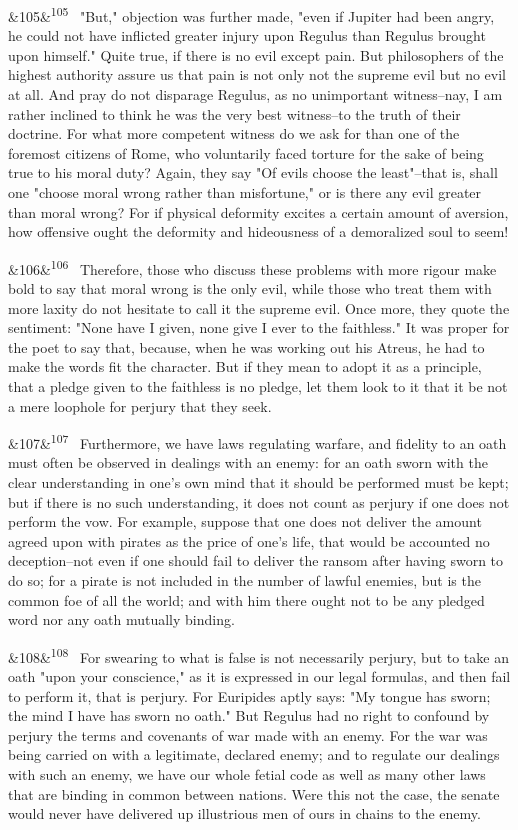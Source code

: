 \documentclass[12pt]{article}
\newcommand{\para}[1][]{\par\noindent\ifx&#1&\else\textsuperscript{\footnotesize #1}~\fi}
\begin{document}
\para[105] "But," objection was further made, "even if Jupiter had been angry, he could not have inflicted greater injury upon Regulus than Regulus brought upon himself." Quite true, if there is no evil except pain. But philosophers of the highest authority assure us that pain is not only not the supreme evil but no evil at all. And pray do not disparage Regulus, as no unimportant witness--nay, I am rather inclined to think he was the very best witness--to the truth of their doctrine. For what more competent witness do we ask for than one of the foremost citizens of Rome, who voluntarily faced torture for the sake of being true to his moral duty? Again, they say "Of evils choose the least"--that is, shall one "choose moral wrong rather than misfortune," or is there any evil greater than moral wrong? For if physical deformity excites a certain amount of aversion, how offensive ought the deformity and hideousness of a demoralized soul to seem!

\para[106] Therefore, those who discuss these problems with more rigour make bold to say that moral wrong is the only evil, while those who treat them with more laxity do not hesitate to call it the supreme evil. Once more, they quote the sentiment: "None have I given, none give I ever to the faithless." It was proper for the poet to say that, because, when he was working out his Atreus, he had to make the words fit the character. But if they mean to adopt it as a principle, that a pledge given to the faithless is no pledge, let them look to it that it be not a mere loophole for perjury that they seek.

\para[107] Furthermore, we have laws regulating warfare, and fidelity to an oath must often be observed in dealings with an enemy: for an oath sworn with the clear understanding in one's own mind that it should be performed must be kept; but if there is no such understanding, it does not count as perjury if one does not perform the vow. For example, suppose that one does not deliver the amount agreed upon with pirates as the price of one's life, that would be accounted no deception--not even if one should fail to deliver the ransom after having sworn to do so; for a pirate is not included in the number of lawful enemies, but is the common foe of all the world; and with him there ought not to be any pledged word nor any oath mutually binding.

\para[108] For swearing to what is false is not necessarily perjury, but to take an oath "upon your conscience," as it is expressed in our legal formulas, and then fail to perform it, that is perjury. For Euripides aptly says: "My tongue has sworn; the mind I have has sworn no oath." But Regulus had no right to confound by perjury the terms and covenants of war made with an enemy. For the war was being carried on with a legitimate, declared enemy; and to regulate our dealings with such an enemy, we have our whole fetial code as well as many other laws that are binding in common between nations. Were this not the case, the senate would never have delivered up illustrious men of ours in chains to the enemy.
\end{document}
